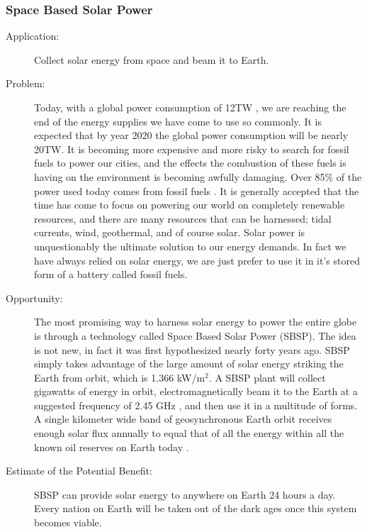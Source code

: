 \subsubsection{Space Based Solar Power}
\label{sbsp}
\begin{description}  \item[Application:] Collect solar energy from space and beam it to  Earth.
 
\item[Problem:] Today, with a  global power consumption of 12TW \cite{Seboldt2004}, we are reaching the end of the  energy supplies we have come to use so commonly. It is expected that by  year 2020 the global power consumption will be nearly 20TW. It is  becoming more expensive and more risky to search for fossil fuels to  power our cities, and the effects the combustion of these fuels is  having on the environment is becoming awfully damaging. Over 85\% of the  power used today comes from fossil fuels \cite{Seboldt2004389}. It is  generally accepted that the time has come to focus on powering our world  on completely renewable resources, and there are many resources that  can be harnessed; tidal currents, wind, geothermal, and of course solar.  Solar power is unquestionably the ultimate solution to our energy  demands. In fact we have always relied on solar energy, we are just  prefer to use it in it's stored form of a battery called fossil fuels.


 
\item[Opportunity:] The most  promising way to harness solar energy to power the entire globe is  through a technology called Space Based Solar Power (SBSP). The idea is  not new, in fact it was first hypothesized nearly forty years ago. SBSP  simply takes advantage of the large amount of solar energy striking the  Earth from orbit, which is 1.366 kW/m$^2$. A SBSP plant will collect  gigawatts of energy in orbit, electromagnetically beam it to the Earth  at a suggested frequency of 2.45 GHz \cite{Chaudhary2010}, and then use it in a multitude  of forms. A single kilometer wide band of geosynchronous Earth orbit  receives enough solar flux annually to equal that of all the energy  within all the known oil reserves on Earth today \cite{NationalSpaceSociety2007}.
 
\item[Estimate of the Potential  Benefit:] SBSP can provide solar energy to anywhere on Earth 24 hours a  day. Every nation on Earth will be taken out of the dark ages once this  system becomes viable.
 

\end{description}

